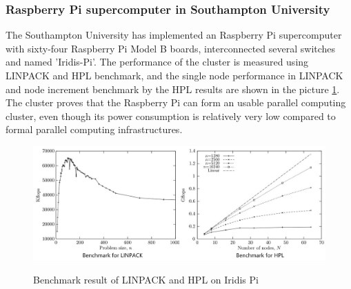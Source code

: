 \documentclass[11pt,openright,a4paper]{report}
\begin{document}
\subsubsection{Raspberry Pi supercomputer in Southampton University}
The Southampton University has implemented an Raspberry Pi supercomputer with sixty-four Raspberry Pi Model B boards, interconnected several switches and named 'Iridis-Pi'\cite{cox2014iridis}. The performance of the cluster is measured using LINPACK and HPL benchmark, and the single node performance in LINPACK and node increment benchmark by the HPL results are shown in the picture \ref{fig:iridisBenchmark}. The cluster proves that the Raspberry Pi can form an usable parallel computing cluster, even though its power consumption is relatively very low compared to formal parallel computing infrastructures.\\
\begin{figure}[H]
\centering
\includegraphics[width=0.6\linewidth]{picture/iridisBenchmark}
\caption{Benchmark result of LINPACK and HPL on Iridis Pi}\cite{cox2014iridis} 
\label{fig:iridisBenchmark}
\end{figure}
\end{document}
